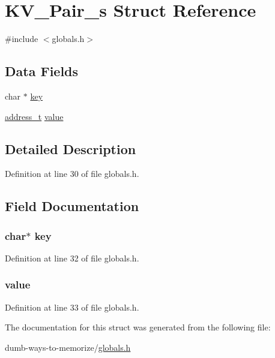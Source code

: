 \hypertarget{struct_k_v___pair__s}{}\section{K\+V\+\_\+\+Pair\+\_\+s Struct Reference}
\label{struct_k_v___pair__s}


{\ttfamily \#include $<$globals.\+h$>$}

\subsection*{Data Fields}
\begin{DoxyCompactItemize}
\item 
char $\ast$ \hyperlink{struct_k_v___pair__s_a5892a9181e6a332f84d27aecd41dcd12}{key}
\item 
\hyperlink{globals_8h_a2bc144218f3051b70834068a1d309e58}{address\+\_\+t} \hyperlink{struct_k_v___pair__s_ad0605b0b73ea8209a58c4bc55c974e26}{value}
\end{DoxyCompactItemize}


\subsection{Detailed Description}


Definition at line 30 of file globals.\+h.



\subsection{Field Documentation}
\subsubsection[{\texorpdfstring{key}{key}}]{\setlength{\rightskip}{0pt plus 5cm}char$\ast$ key}\hypertarget{struct_k_v___pair__s_a5892a9181e6a332f84d27aecd41dcd12}{}\label{struct_k_v___pair__s_a5892a9181e6a332f84d27aecd41dcd12}


Definition at line 32 of file globals.\+h.

\subsubsection[{\texorpdfstring{value}{value}}]{ value}\hypertarget{struct_k_v___pair__s_ad0605b0b73ea8209a58c4bc55c974e26}{}\label{struct_k_v___pair__s_ad0605b0b73ea8209a58c4bc55c974e26}


Definition at line 33 of file globals.\+h.



The documentation for this struct was generated from the following file\+:\begin{DoxyCompactItemize}
\item 
dumb-\/ways-\/to-\/memorize/\hyperlink{globals_8h}{globals.\+h}\end{DoxyCompactItemize}
